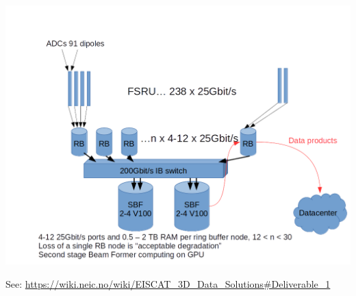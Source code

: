 \begin{frame}[fragile,t]
\frametitle{\hfill}
\begin{center}
  \includegraphics[width=\textwidth]{SBF-GPU-mod-1.png}
\end{center}
\vspace{-0.125in}
{\colblack See: {\scriptsize \url{https://wiki.neic.no/wiki/EISCAT_3D_Data_Solutions#Deliverable_1}}}
\end{frame}
